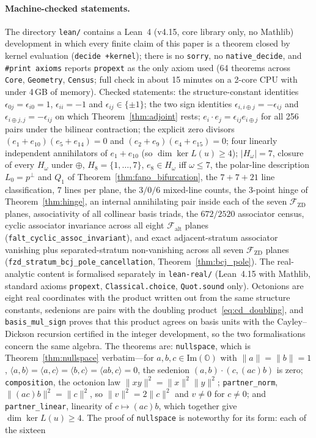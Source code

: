 \documentclass[11pt,a4paper]{article}
\theoremstyle{definition}
\theoremstyle{remark}
\newcommand{\Oc}{\mathbb{O}}
\newcommand{\ImPart}{\mathrm{Im}}
\newcommand{\Falt}{\mathcal{F}_{\mathrm{alt}}}
\newcommand{\Fzd}{\mathcal{F}_{\mathrm{ZD}}}
\begin{document}
\paragraph{Machine-checked statements.} The directory \texttt{lean/} contains a Lean~4 (v4.15, core library only, no Mathlib) development in which every finite claim of this paper is a theorem closed by kernel evaluation (\texttt{decide +kernel}); there is no \texttt{sorry}, no \texttt{native\_decide}, and \texttt{\#print axioms} reports \texttt{propext} as the only axiom used (64 theorems across \texttt{Core}, \texttt{Geometry}, \texttt{Census}; full check in about 15 minutes on a 2-core CPU with under 4\,GB of memory). Checked statements: the structure-constant identities $\epsilon_{0j} = \epsilon_{i0} = 1$, $\epsilon_{ii} = -1$ and $\epsilon_{ij} \in \{\pm 1\}$; the two sign identities $\epsilon_{i, i \oplus j} = -\epsilon_{ij}$ and $\epsilon_{i \oplus j, j} = -\epsilon_{ij}$ on which Theorem~\ref{thm:adjoint} rests; $e_i \cdot e_j = \epsilon_{ij} e_{i \oplus j}$ for all 256 pairs under the bilinear contraction; the explicit zero divisors $(e_1 + e_{10})(e_5 + e_{14}) = 0$ and $(e_2 + e_9)(e_4 + e_{15}) = 0$; four linearly independent annihilators of $e_1 + e_{10}$ (so $\dim \ker L(u) \ge 4$); $|H_\omega| = 7$, closure of every $H_\omega$ under $\oplus$, $H_8 = \{1, \dots, 7\}$, $e_8 \in H_\omega$ iff $\omega \le 7$, the polar-line description $L_0 = p^\perp$ and $Q_1$ of Theorem~\ref{thm:fano_bifurcation}, the $7 + 7 + 21$ line classification, $7$ lines per plane, the $3/0/6$ mixed-line counts, the 3-point hinge of Theorem~\ref{thm:hinge}, an internal annihilating pair inside each of the seven $\Fzd$ planes, associativity of all collinear basis triads, the $672/2520$ associator census, cyclic associator invariance across all eight $\Falt$ planes (\texttt{falt\_cyclic\_assoc\_invariant}), and exact adjacent-stratum associator vanishing plus separated-stratum non-vanishing across all seven $\Fzd$ planes (\texttt{fzd\_stratum\_bcj\_pole\_cancellation}, Theorem~\ref{thm:bcj_pole}). The real-analytic content is formalised separately in \texttt{lean-real/} (Lean~4.15 with Mathlib, standard axioms \texttt{propext}, \texttt{Classical.choice}, \texttt{Quot.sound} only). Octonions are eight real coordinates with the product written out from the same structure constants, sedenions are pairs with the doubling product~\eqref{eq:cd_doubling}, and \texttt{basis\_mul\_sign} proves that this product agrees on basis units with the Cayley--Dickson recursion certified in the integer development, so the two formalisations concern the same algebra. The theorems are: \texttt{nullspace}, which is Theorem~\ref{thm:nullspace} verbatim---for $a, b, c \in \ImPart(\Oc)$ with $\|a\| = \|b\| = 1$, $\langle a, b \rangle = \langle a, c \rangle = \langle b, c \rangle = \langle ab, c \rangle = 0$, the sedenion $(a, b) \cdot (c, (ac)b)$ is zero; \texttt{composition}, the octonion law $\|xy\|^2 = \|x\|^2 \|y\|^2$; \texttt{partner\_norm}, $\|(ac)b\|^2 = \|c\|^2$, so $\|v\|^2 = 2\|c\|^2$ and $v \neq 0$ for $c \neq 0$; and \texttt{partner\_linear}, linearity of $c \mapsto (ac)b$, which together give $\dim \ker L(u) \ge 4$. The proof of \texttt{nullspace} is noteworthy for its form: each of the sixteen 
\end{document}
